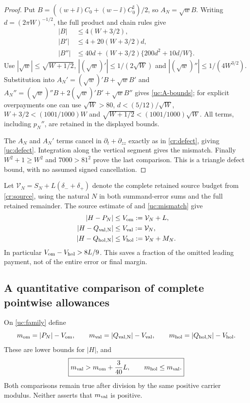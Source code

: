 \begin{proof}
Put $B=((w+\ii)C_0+(w-\ii)C_0^\sharp)/2$, so $A_N=\sqrt w B$.
Writing $d=(2\pi W)^{-1/2}$, the full product and chain rules give
\begin{align*}
 |B|&\le4(W+3/2),\\
 |B'|&\le4+20(W+3/2)d,\\
 |B''|&\le40d+(W+3/2)\{200d^2+10d/W\}.
\end{align*}
Use $|\sqrt w|\le\sqrt{W+1/2}$,
$|(\sqrt w)'|\le1/(2\sqrt W)$ and
$|(\sqrt w)''|\le1/(4W^{3/2})$.
Substitution into $A_N'=(\sqrt w)'B+\sqrt w B'$ and
$A_N''=(\sqrt w)''B+2(\sqrt w)'B'+\sqrt w B''$
gives \eqref{uc:A-bounds}; for explicit overpayments one can use
$\sqrt W>80$, $d<(5/12)/\sqrt W$,
$W+3/2<(1001/1000)W$ and
$\sqrt{W+1/2}<(1001/1000)\sqrt W$.
All terms, including $p_N''$, are retained in the displayed bounds.

The $A_N$ and $A_N'$ terms cancel in $\partial_t+\partial_{zz}$
exactly as in \eqref{cr:defect}, giving \eqref{uc:defect}.
Integration along the vertical segment gives the mismatch.
Finally $W^2+1\ge W^2$ and $7000>81^2$ prove the last comparison.
This is a triangle defect bound, with no assumed signed cancellation.
\end{proof}

Let $\mathcal V_N=S_N+L(\delta_-+\delta_+)$ denote the complete
retained source budget from \eqref{cr:source}, using the natural $N$ in
both summand-error sums and the full retained remainder. The source
estimate of \cite[Corollary 6.4]{Polymath2019} and
\eqref{uc:mismatch} give
\begin{align}
 |H-P_N|&\le V_{\rm om}:=\mathcal V_N+L,\notag\\
 |H-Q_{\rm val,N}|&\le V_{\rm val}:=\mathcal V_N,\notag\\
 |H-Q_{\rm hol,N}|&\le V_{\rm hol}:=\mathcal V_N+M_N.
 \label{uc:budgets}
\end{align}
In particular $V_{\rm om}-V_{\rm hol}>8L/9$. This saves a fraction
of the omitted leading payment, not of the entire error or final margin.

\subsection{A quantitative comparison of complete pointwise allowances}

\begin{theorem}
On \eqref{uc:family} define
\[
 m_{\rm om}=|P_N|-V_{\rm om},\qquad
 m_{\rm val}=|Q_{\rm val,N}|-V_{\rm val},\qquad
 m_{\rm hol}=|Q_{\rm hol,N}|-V_{\rm hol}.
\]
These are lower bounds for $|H|$, and
\begin{equation}
 \boxed{m_{\rm val}>m_{\rm om}+\frac3{40}L,
 \qquad m_{\rm hol}\le m_{\rm val}.}
 \label{uc:complete-comparison}
\end{equation}
Both comparisons remain true after division by the same positive
carrier modulus. Neither asserts that $m_{\rm val}$ is positive.
\end{theorem}


